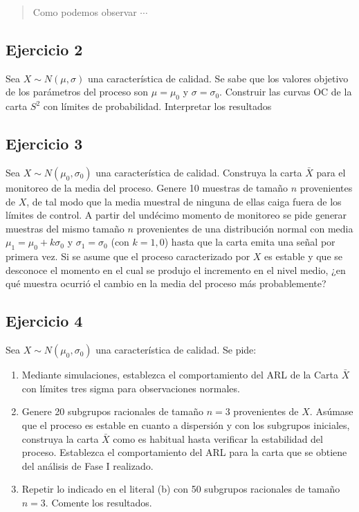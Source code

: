 \documentclass{article}
\begin{document}
\begin{quote}
\small Como podemos observar \(\cdots\)
\end{quote}

\hypertarget{ejercicio-2}{%
\subsection{Ejercicio 2}\label{ejercicio-2}}

Sea \(X \sim N(\mu, \sigma)\) una característica de calidad. Se sabe que
los valores objetivo de los parámetros del proceso son \(\mu = \mu_0\) y
\(\sigma = \sigma_0\). Construir las curvas OC de la carta \(S^2\) con
límites de probabilidad. Interpretar los resultados

\hypertarget{ejercicio-3}{%
\subsection{Ejercicio 3}\label{ejercicio-3}}

Sea \(X \sim N(\mu_0, \sigma_0)\) una característica de calidad.
Construya la carta \(\bar{X}\) para el monitoreo de la media del
proceso. Genere 10 muestras de tamaño \(n\) provenientes de \(X\), de
tal modo que la media muestral de ninguna de ellas caiga fuera de los
límites de control. A partir del undécimo momento de monitoreo se pide
generar muestras del mismo tamaño \(n\) provenientes de una distribución
normal con media \(\mu_1 = \mu_0 + k\sigma_0\) y \(\sigma_1 = \sigma_0\)
(con \(k = 1,0\)) hasta que la carta emita una señal por primera vez. Si
se asume que el proceso caracterizado por \(X\) es estable y que se
desconoce el momento en el cual se produjo el incremento en el nivel
medio, ¿en qué muestra ocurrió el cambio en la media del proceso más
probablemente?

\hypertarget{ejercicio-4}{%
\subsection{Ejercicio 4}\label{ejercicio-4}}

Sea \(X \sim N(\mu_0, \sigma_0)\) una característica de calidad. Se
pide:\\

\begin{enumerate}
  \item Mediante simulaciones, establezca el comportamiento del ARL de la Carta $\bar{X}$ con límites tres sigma para observaciones normales.
  \item Genere 20 subgrupos racionales de tamaño $n = 3$ provenientes de $X$. Asúmase que el proceso es estable en cuanto a dispersión y con los subgrupos iniciales, construya la carta $\bar{X}$ como es habitual hasta verificar la estabilidad del proceso. Establezca el comportamiento del ARL para la carta que se obtiene del análisis de Fase I realizado.
  \item Repetir lo indicado en el literal (b) con 50 subgrupos racionales de tamaño $n = 3$. Comente los resultados.
\end{enumerate}
\end{document}
